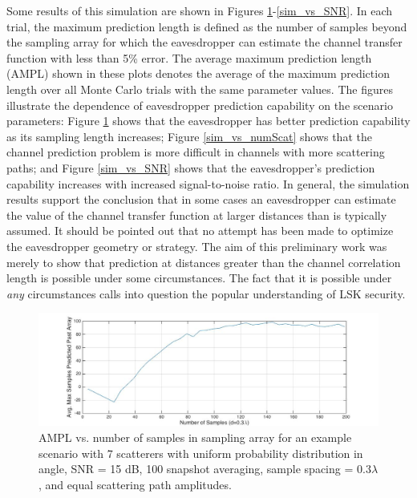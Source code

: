 \documentclass[12pt, titlepage]{article}
\begin{document}
Some results of this simulation are shown in Figures \ref{sim_vs_samples}-\ref{sim_vs_SNR}.  In each trial, the maximum prediction length is defined as the number of samples beyond the sampling array for which the eavesdropper can estimate the channel transfer function with less than 5\% error.  The average maximum prediction length (AMPL) shown in these plots denotes the average of the maximum prediction length over all Monte Carlo trials with the same parameter values.  The figures illustrate the dependence of eavesdropper prediction capability on the scenario parameters: Figure \ref{sim_vs_samples} shows that the eavesdropper has better prediction capability as its sampling length increases; Figure \ref{sim_vs_numScat} shows that the channel prediction problem is more difficult in channels with more scattering paths; and Figure \ref{sim_vs_SNR} shows that the eavesdropper's prediction capability increases with increased signal-to-noise ratio.  In general, the simulation results support the conclusion that in some cases an eavesdropper can estimate the value of the channel transfer function at larger distances than is typically assumed.  It should be pointed out that no attempt has been made to optimize the eavesdropper geometry or strategy.  The aim of this preliminary work was merely to show that prediction at distances greater than the channel correlation length is possible under some circumstances.  The fact that it is possible under \emph{any} circumstances calls into question the popular understanding of LSK security.
\begin{figure}
\begin{center}
\includegraphics[width=\textwidth]{Small_N_1000}
\caption{AMPL vs. number of samples in sampling array for an example scenario with 7 scatterers with uniform probability distribution in angle, SNR = 15 dB, 100 snapshot averaging, sample spacing = $0.3 \lambda$, and equal scattering path amplitudes.}\label{sim_vs_samples}
\end{center}
\end{figure}
\end{document}
